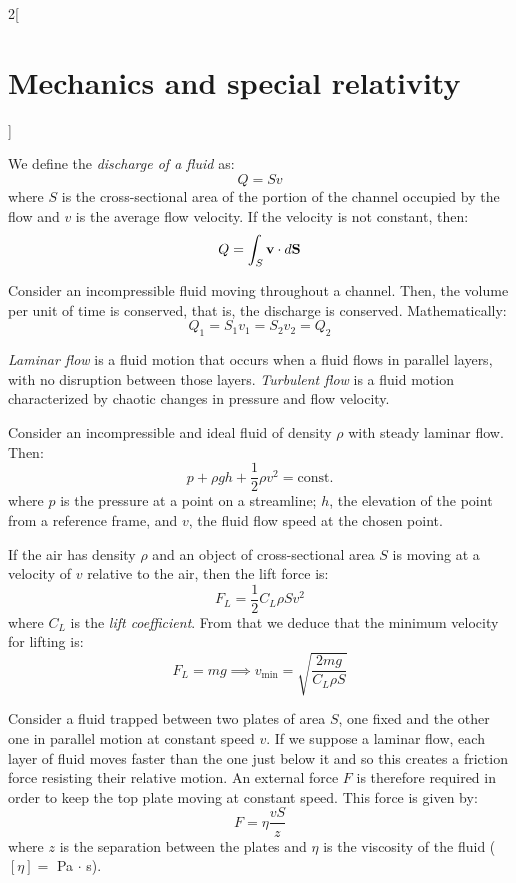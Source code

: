 \documentclass[../../../main_physics.tex]{subfiles}
\begin{document}
\begin{multicols}{2}[\section{Mechanics and special relativity}]
\begin{proposition}
  \end{proposition}
  \begin{definition}
    We define the \emph{discharge of a fluid} as: $$Q=Sv$$ where $S$ is the cross-sectional area of the portion of the channel occupied by the flow and $v$ is the average flow velocity. If the velocity is not constant, then: $$Q=\int_S\boldsymbol{\mathrm{v}}\cdot d\boldsymbol{\mathrm{S}}$$
  \end{definition}
  \begin{proposition}
    Consider an incompressible fluid moving throughout a channel. Then, the volume per unit of time is conserved, that is, the discharge is conserved. Mathematically: $$Q_1=S_1v_1=S_2v_2=Q_2$$
  \end{proposition}
  \begin{definition}
    \emph{Laminar flow} is a fluid motion that occurs when a fluid flows in parallel layers, with no disruption between those layers. \emph{Turbulent flow} is a fluid motion characterized by chaotic changes in pressure and flow velocity.
  \end{definition}
  \begin{center}
    \begin{minipage}{\linewidth}
      \centering
      
    \end{minipage}
  \end{center}
  \begin{proposition}
    Consider an incompressible and ideal fluid of density $\rho$ with steady laminar flow. Then: $$p+\rho gh+\frac{1}{2}\rho v^2=\text{const.}$$ where $p$ is the pressure at a point on a streamline; $h$, the elevation of the point from a reference frame, and $v$, the fluid flow speed at the chosen point.
  \end{proposition}
  \begin{proposition}
    If the air has density $\rho$ and an object of cross-sectional area $S$ is moving at a velocity of $v$ relative to the air, then the lift force is: $$F_L=\frac{1}{2}C_L\rho Sv^2$$ where $C_L$ is the \emph{lift coefficient}. From that we deduce that the minimum velocity for lifting is: $$F_L=mg\implies v_\text{min}=\sqrt{\frac{2mg}{C_L\rho S}}$$
  \end{proposition}
  \begin{proposition}[Viscosity]
    Consider a fluid trapped between two plates of area $S$, one fixed and the other one in parallel motion at constant speed $v$. If we suppose a laminar flow, each layer of fluid moves faster than the one just below it and so this creates a friction force  resisting their relative motion. An external force $F$ is therefore required in order to keep the top plate moving at constant speed. This force is given by: $$F=\eta\frac{vS}{z}$$ where $z$ is the separation between the plates and $\eta$ is the viscosity of the fluid ($[\eta]=$ Pa $\cdot$ s).

\end{proposition}
\end{multicols}
\end{document}
